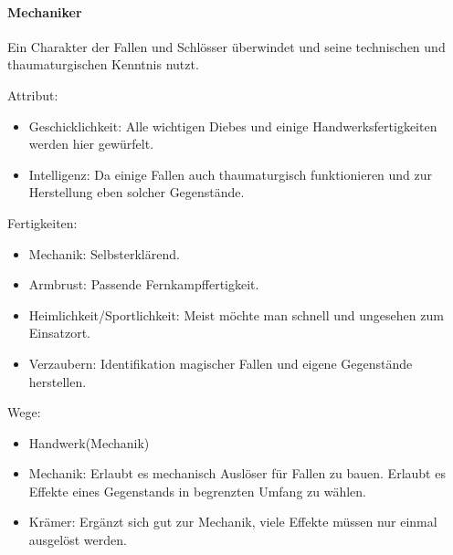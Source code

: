 \documentclass{article}
\begin{document}
\paragraph{Mechaniker}
Ein Charakter der Fallen und Schlösser überwindet und seine technischen und thaumaturgischen Kenntnis nutzt.

Attribut:
\begin{itemize}
\item Geschicklichkeit: Alle wichtigen Diebes und einige Handwerksfertigkeiten werden hier gewürfelt.
\item Intelligenz: Da einige Fallen auch thaumaturgisch funktionieren und zur Herstellung eben solcher Gegenstände.
\end{itemize}

Fertigkeiten:
\begin{itemize}
\item Mechanik: Selbsterklärend.
\item Armbrust: Passende Fernkampffertigkeit.
\item Heimlichkeit/Sportlichkeit: Meist möchte man schnell und ungesehen zum Einsatzort.
\item Verzaubern: Identifikation magischer Fallen und eigene Gegenstände herstellen.
\end{itemize}

Wege:
\begin{itemize}
\item Handwerk(Mechanik)
\item Mechanik: Erlaubt es mechanisch Auslöser für Fallen zu bauen. Erlaubt es Effekte eines Gegenstands in begrenzten Umfang zu wählen.
\item Krämer: Ergänzt sich gut zur Mechanik, viele Effekte müssen nur einmal ausgelöst werden.
\end{itemize}
\end{document}
